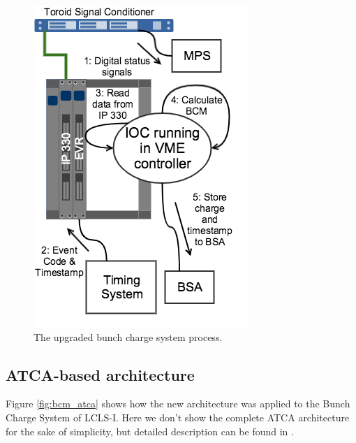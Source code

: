 \documentclass[letter,
               biblatex,     %
               keeplastbox,   %
               ]{jacow}
\begin{document}
\begin{figure}[!htb]
   \centering
   \includegraphics*[width=\columnwidth]{BCM_VME_Process}
   \caption{The upgraded bunch charge system process.}
   \label{fig:bcm_vme}
\end{figure}

\subsection{ATCA-based architecture}
Figure \ref{fig:bcm_atca} shows how the new architecture was applied to the Bunch Charge System of LCLS-I. Here we don't show the complete ATCA architecture for the sake of simplicity, but detailed description can be found in \cite{ryan-2016, atca-bpm-2017}.
\end{document}
